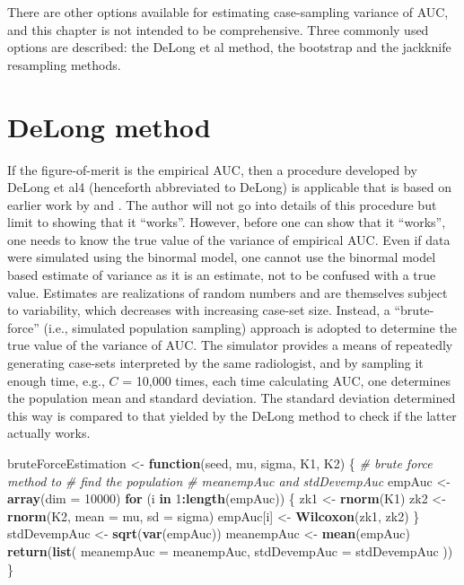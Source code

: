 \documentclass[
]{book}
\newenvironment{Shaded}{\begin{snugshade}}{\end{snugshade}}
\newcommand{\CommentTok}[1]{\textcolor[rgb]{0.56,0.35,0.01}{\textit{#1}}}
\newcommand{\ControlFlowTok}[1]{\textcolor[rgb]{0.13,0.29,0.53}{\textbf{#1}}}
\newcommand{\DataTypeTok}[1]{\textcolor[rgb]{0.13,0.29,0.53}{#1}}
\newcommand{\DecValTok}[1]{\textcolor[rgb]{0.00,0.00,0.81}{#1}}
\newcommand{\KeywordTok}[1]{\textcolor[rgb]{0.13,0.29,0.53}{\textbf{#1}}}
\newcommand{\NormalTok}[1]{#1}
\newcommand{\OperatorTok}[1]{\textcolor[rgb]{0.81,0.36,0.00}{\textbf{#1}}}
\newcommand{\StringTok}[1]{\textcolor[rgb]{0.31,0.60,0.02}{#1}}
\begin{document}
There are other options available for estimating case-sampling variance of AUC, and this chapter is not intended to be comprehensive. Three commonly used options are described: the DeLong et al method, the bootstrap and the jackknife resampling methods.

\hypertarget{sources-of-variabilityDeLong}{%
\section{DeLong method}\label{sources-of-variabilityDeLong}}

If the figure-of-merit is the empirical AUC, then a procedure developed by DeLong et al4 (henceforth abbreviated to DeLong) is applicable that is based on earlier work by \citep{RN2530} and \citep{RN2174}. The author will not go into details of this procedure but limit to showing that it ``works''. However, before one can show that it ``works'', one needs to know the true value of the variance of empirical AUC. Even if data were simulated using the binormal model, one cannot use the binormal model based estimate of variance as it is an estimate, not to be confused with a true value. Estimates are realizations of random numbers and are themselves subject to variability, which decreases with increasing case-set size. Instead, a ``brute-force'' (i.e., simulated population sampling) approach is adopted to determine the true value of the variance of AUC. The simulator provides a means of repeatedly generating case-sets interpreted by the same radiologist, and by sampling it enough time, e.g., \(C\) = 10,000 times, each time calculating AUC, one determines the population mean and standard deviation. The standard deviation determined this way is compared to that yielded by the DeLong method to check if the latter actually works.

\begin{Shaded}
\begin{Highlighting}[]
\NormalTok{bruteForceEstimation <-}
\StringTok{  }\ControlFlowTok{function}\NormalTok{(seed, mu, sigma, K1, K2) \{}
    \CommentTok{# brute force method to}
    \CommentTok{# find the population }
    \CommentTok{# meanempAuc and stdDevempAuc}
\NormalTok{    empAuc <-}\StringTok{ }\KeywordTok{array}\NormalTok{(}\DataTypeTok{dim =} \DecValTok{10000}\NormalTok{)}
    \ControlFlowTok{for}\NormalTok{ (i }\ControlFlowTok{in} \DecValTok{1}\OperatorTok{:}\KeywordTok{length}\NormalTok{(empAuc)) \{}
\NormalTok{      zk1 <-}\StringTok{ }\KeywordTok{rnorm}\NormalTok{(K1)}
\NormalTok{      zk2 <-}\StringTok{ }\KeywordTok{rnorm}\NormalTok{(K2, }\DataTypeTok{mean =}\NormalTok{ mu, }\DataTypeTok{sd =}\NormalTok{ sigma)}
\NormalTok{      empAuc[i] <-}\StringTok{ }\KeywordTok{Wilcoxon}\NormalTok{(zk1, zk2)}
\NormalTok{    \}}
\NormalTok{    stdDevempAuc  <-}\StringTok{  }\KeywordTok{sqrt}\NormalTok{(}\KeywordTok{var}\NormalTok{(empAuc))}
\NormalTok{    meanempAuc   <-}\StringTok{  }\KeywordTok{mean}\NormalTok{(empAuc)}
    \KeywordTok{return}\NormalTok{(}\KeywordTok{list}\NormalTok{(}
      \DataTypeTok{meanempAuc =}\NormalTok{ meanempAuc,}
      \DataTypeTok{stdDevempAuc =}\NormalTok{ stdDevempAuc}
\NormalTok{    ))}
\NormalTok{  \}}
\end{Highlighting}
\end{Shaded}
\end{document}
